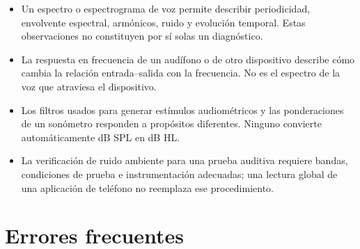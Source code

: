 \begin{itemize}
    \item Un espectro o espectrograma de voz permite describir periodicidad,
    envolvente espectral, armónicos, ruido y evolución temporal. Estas
    observaciones no constituyen por sí solas un diagnóstico.
    \item La respuesta en frecuencia de un audífono o de otro dispositivo
    describe cómo cambia la relación entrada--salida con la frecuencia. No es
    el espectro de la voz que atraviesa el dispositivo.
    \item Los filtros usados para generar estímulos audiométricos y las
    ponderaciones de un sonómetro responden a propósitos diferentes. Ninguno
    convierte automáticamente dB SPL en dB HL.
    \item La verificación de ruido ambiente para una prueba auditiva requiere
    bandas, condiciones de prueba e instrumentación adecuadas; una lectura
    global de una aplicación de teléfono no reemplaza ese procedimiento.
\end{itemize}


\section{Errores frecuentes}
\label{sec:u5-errores-frecuentes}

